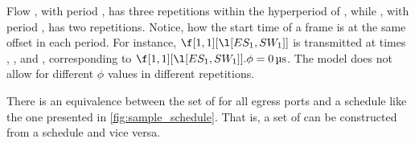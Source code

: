 Flow \s[1], with period , has three repetitions within the hyperperiod of , while \s[2], with period , has two repetitions.
Notice, how the start time of a frame is at the same offset in each period.
For instance, $\f[1,1][{\l[ES_1, SW_1]}]$ is transmitted at times , , and , corresponding to $\f[1,1][{\l[ES_1, SW_1]}].\phi = \mus{0}$. The model does not allow for different $\phi$ values in different repetitions.

There is an equivalence between the set of  for all egress ports and a schedule like the one presented in \autoref{fig:sample_schedule}.
That is, a set of  can be constructed from a schedule and vice versa.